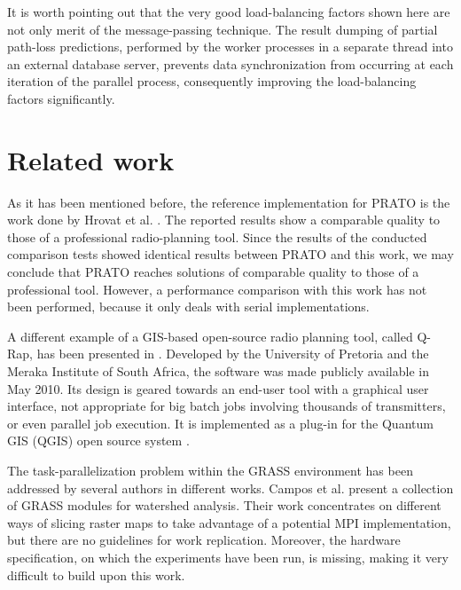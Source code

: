 It is worth pointing out that the very good load-balancing factors
shown here are not only merit of the message-passing technique. The
result dumping of partial path-loss predictions, performed by the
worker processes in a separate thread into an external database server,
prevents data synchronization from occurring at each iteration of
the parallel process, consequently improving the load-balancing factors
significantly.


\section{Related work \label{sec:Related-work}}

As it has been mentioned before, the reference implementation for
PRATO is the work done by Hrovat et al. \cite{Ozimek_Open.source.radio.coverage.prediction:2010}.
The reported results show a comparable quality to those of a professional
radio-planning tool. Since the results of the conducted comparison
tests showed identical results between PRATO and this work, we may
conclude that PRATO reaches solutions of comparable quality to those
of a professional tool. However, a performance comparison with this
work has not been performed, because it only deals with serial implementations. 

A different example of a GIS-based open-source radio planning tool,
called Q-Rap, has been presented in \cite{QRap}. Developed by the
University of Pretoria and the Meraka Institute of South Africa, the
software was made publicly available in May 2010. Its design is geared
towards an end-user tool with a graphical user interface, not appropriate
for big batch jobs involving thousands of transmitters, or even parallel
job execution. It is implemented as a plug-in for the Quantum GIS
(QGIS) open source system \cite{QuantumGIS}.

The task-parallelization problem within the GRASS environment has
been addressed by several authors in different works. Campos et al.
\cite{Campos_Parallel_modelling_in_GIS:2012} present a collection
of GRASS modules for watershed analysis. Their work concentrates on
different ways of slicing raster maps to take advantage of a potential
MPI implementation, but there are no guidelines for work replication.
Moreover, the hardware specification, on which the experiments have
been run, is missing, making it very difficult to build upon this
work.

